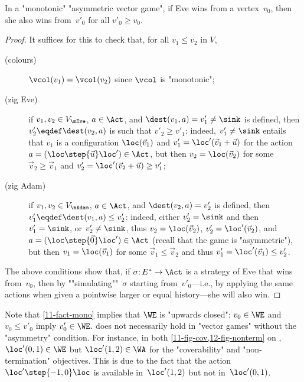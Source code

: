 \begin{lemma}[Simulation]\label{11-fact-mono}
  In a "monotonic" "asymmetric vector game", if Eve wins from a
  vertex~$v_0$, then she also wins from~$v'_0$ for all $v'_0\geq
  v_0$.
\end{lemma}
\begin{proof}
  It suffices for this to check that, for all $v_1\leq v_2$ in $V$,
  \begin{description}
  \item[(colours)] $\vcol(v_1)=\vcol(v_2)$ since $\vcol$ is "monotonic";
  \item[(zig Eve)] if $v_1,v_2\in V_\mEve$, $a\in\Act$, and
    $\dest(v_1,a)=v'_1\neq\sink$ is defined, then
    $v'_2\eqdef\dest(v_2,a)$ is such that $v'_2\geq v'_1$: indeed,
    $v'_1\neq\sink$ entails that $v_1$ is a configuration
    $\loc(\vec v_1)$ and $v'_1=\loc'(\vec v_1+\vec u)$ for the action
    $a=(\loc\step{\vec u}\loc')\in\Act$, but then $v_2=\loc(\vec v_2)$
    for some $\vec v_2\geq\vec v_1$ and
    $v'_2=\loc'(\vec v_2+\vec u)\geq v'_1$;
  \item[(zig Adam)] if $v_1,v_2\in V_\mAdam$, $a\in\Act$, and
    $\dest(v_2,a)=v'_2$ is defined, then
    $v'_1\eqdef\dest(v_1,a)\leq v'_2$: indeed, either $v'_2=\sink$ and
    then $v'_1=\sink$, or $v'_2\neq\sink$, thus
    $v_2=\loc(\vec v_2)$, $v'_2=\loc'(\vec v_2)$, and
    $a=(\loc\step{\vec 0}\loc')\in\Act$ (recall that the game is
    "asymmetric"), but then $v_1=\loc(\vec v_1)$ for some
    $\vec v_1\leq\vec v_2$ and thus $v'_1=\loc'(\vec v_1)\leq v'_2$.
  \end{description}
  The above conditions show that, if $\sigma{:}\,E^\ast\to\Act$ is a
  strategy of Eve that wins from~$v_0$, then by
  ""simulating""~$\sigma$ starting from~$v'_0$---i.e., by applying the
  same actions when given a pointwise larger or equal history---she
  will also win.
\end{proof}

Note that \cref{11-fact-mono} implies that $\WE$ is "upwards closed":
$v_0\in\WE$ and $v_0\leq v'_0$ imply $v_0'\in\WE$.  
does not necessarily hold in "vector games" without the "asymmetry"
condition.  For instance, in both \cref{11-fig-cov,12-fig-nonterm} on
, $\loc'(0,1)\in\WE$ but $\loc'(1,2)\in\WA$ for
the "coverability" and "non-termination" objectives.  This is due to
the fact that the action $\loc'\step{-1,0}\loc$ is available
in~$\loc'(1,2)$ but not in~$\loc'(0,1)$.


